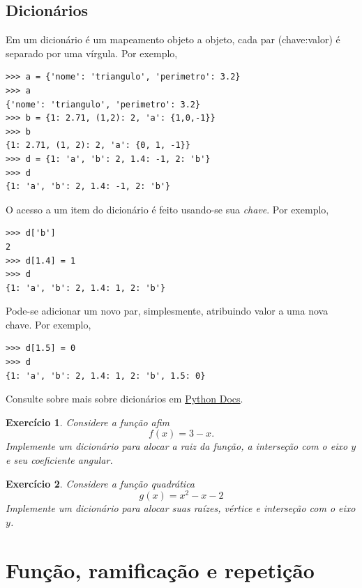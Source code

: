 \documentclass[12pt]{article}
\newtheorem{exr}{Exercício}[section]
\begin{document}
\subsection{Dicionários}

Em {\python} um dicionário é um mapeamento objeto a objeto, cada par (chave:valor) é separado por uma vírgula. Por exemplo,
\begin{lstlisting}
>>> a = {'nome': 'triangulo', 'perimetro': 3.2}
>>> a
{'nome': 'triangulo', 'perimetro': 3.2}
>>> b = {1: 2.71, (1,2): 2, 'a': {1,0,-1}}
>>> b
{1: 2.71, (1, 2): 2, 'a': {0, 1, -1}}
>>> d = {1: 'a', 'b': 2, 1.4: -1, 2: 'b'}
>>> d
{1: 'a', 'b': 2, 1.4: -1, 2: 'b'}
\end{lstlisting}

O acesso a um item do dicionário é feito usando-se sua \emph{chave}. Por exemplo,
\begin{lstlisting}
>>> d['b']
2
>>> d[1.4] = 1
>>> d
{1: 'a', 'b': 2, 1.4: 1, 2: 'b'}
\end{lstlisting}
Pode-se adicionar um novo par, simplesmente, atribuindo valor a uma nova chave. Por exemplo,
\begin{lstlisting}
>>> d[1.5] = 0
>>> d
{1: 'a', 'b': 2, 1.4: 1, 2: 'b', 1.5: 0}
\end{lstlisting}

\begin{obs}
  Consulte sobre mais sobre dicionários em \href{https://docs.python.org/3/tutorial/datastructures.html#dictionaries}{Python Docs}.
\end{obs}

\begin{exr}
  Considere a função afim
  \begin{equation}
    f(x) = 3 - x.
  \end{equation}
  Implemente um dicionário para alocar a raiz da função, a interseção com o eixo $y$ e seu coeficiente angular.
\end{exr}

\begin{exr}
  Considere a função quadrática
  \begin{equation}
    g(x) = x^2 - x - 2
  \end{equation}
  Implemente um dicionário para alocar suas raízes, vértice e interseção com o eixo $y$.
\end{exr}

\section{Função, ramificação e repetição}\label{sec_fun}
\end{document}
